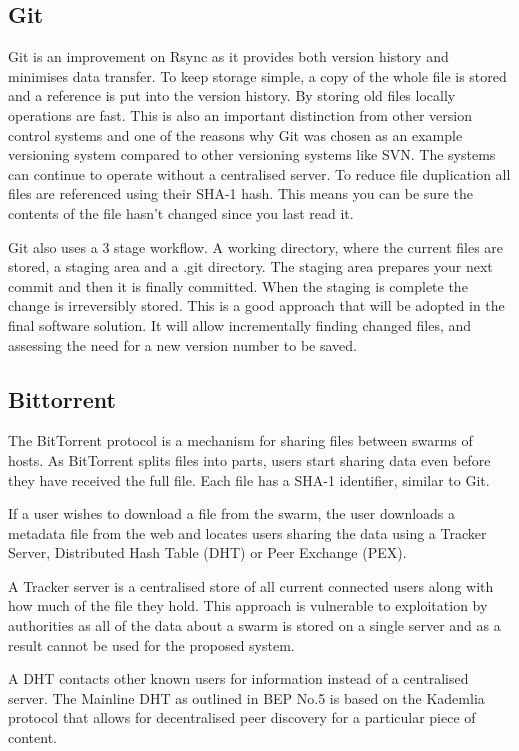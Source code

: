 \documentclass[11pt, a4paper, twocolumn, twoside]{report}
\begin{document}
\subsection{Git}
Git is an improvement on Rsync as it provides both version history and minimises data transfer. To keep storage simple, a copy of the whole file is stored and a reference is put into the version history. By storing old files locally operations are fast. This is also an important distinction from other version control systems and one of the reasons why Git was chosen as an example versioning system compared to other versioning systems like SVN. The systems can continue to operate without a centralised server. To reduce file duplication all files are referenced using their SHA-1 hash. This means you can be sure the contents of the file hasn’t changed since you last read it. \citep{torvalds2010git}

Git also uses a 3 stage workflow. A working directory, where the current files are stored, a staging area and a .git directory. The staging area prepares your next commit and then it is finally committed. When the staging is complete the change is irreversibly stored. This is a good approach that will be adopted in the final software solution. It will allow incrementally finding changed files, and assessing the need for a new version number to be saved.


\subsection{Bittorrent}
The BitTorrent protocol is a mechanism for sharing files between swarms of hosts. As BitTorrent splits files into parts, users start sharing data even before they have received the full file. Each file has a SHA-1 identifier, similar to Git. \citep{qiu2004modeling}

If a user wishes to download a file from the swarm, the user downloads a metadata file from the web and locates users sharing the data using a Tracker Server, Distributed Hash Table (DHT) or Peer Exchange (PEX). \citep{cohen2008bittorrent}

A Tracker server is a centralised store of all current connected users along with how much of the file they hold. This approach is vulnerable to exploitation by authorities as all of the data about a swarm is stored on a single server and as a result cannot be used for the proposed system.

A DHT contacts other known users for information instead of a centralised server. The Mainline DHT as outlined in BEP No.5 is based on the Kademlia protocol that allows for decentralised peer discovery for a particular piece of content.
\end{document}
